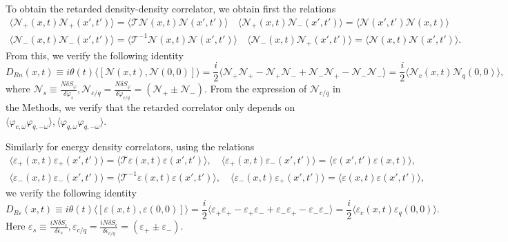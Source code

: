 \documentclass[twocolumn,floatfix,superscriptaddress]{revtex4-1}
\newcommand{\ket}{\rangle}
\newcommand{\bra}{\langle}
\begin{document}
\begin{widetext}
To obtain the retarded density-density correlator, we obtain first the relations
\begin{eqnarray}
\bra  \mathcal N_+(x,t)\mathcal N_+(x',t')\ket =\bra \mathcal T\mathcal N(x,t)\mathcal N(x',t')\ket\quad
\bra\mathcal N_+(x,t)\mathcal N_-(x',t')\ket=\bra\mathcal N(x',t')\mathcal N(x,t)\ket\nonumber\\
\bra  \mathcal N_-(x,t)\mathcal N_-(x',t')\ket =\bra \mathcal T^{-1}\mathcal N(x,t)\mathcal N(x',t')\ket\quad
\bra\mathcal N_-(x,t)\mathcal N_+(x',t')\ket=\bra\mathcal N(x,t)\mathcal N(x',t')\ket.
\end{eqnarray}
From this, we verify the following identity
\begin{equation}
D_{Rn}(x,t)\equiv i\theta(t)\bra[\mathcal N(x,t),\mathcal N(0,0)]\ket =\frac{i}{2}\bra \mathcal N_+\mathcal N_+-\mathcal N_+\mathcal N_-+\mathcal N_-\mathcal N_+-\mathcal N_-\mathcal N_-\ket=\frac{i}{2}\bra \mathcal N_c(x,t)\mathcal N_q(0,0)\ket,
\end{equation}
where $\mathcal N_s\equiv \frac{N\delta S_\varphi}{\delta \dot\varphi_s}, \mathcal N_{c/q}=\frac{N\delta S_\varphi}{\delta \dot\varphi_{c/q}}=(\mathcal N_+\pm\mathcal N_-)$. From the expression of $\mathcal N_{c/q}$ in the Methods, we verify that the retarded correlator only depends on $\bra \varphi_{c,\omega}\varphi_{q,-\omega}\ket,\bra \varphi_{q,\omega}\varphi_{q,-\omega}\ket$.  

Similarly for energy density correlators, using the relations
\begin{eqnarray}
\bra  \varepsilon_+(x,t)\varepsilon_+(x',t')\ket =\bra \mathcal T\varepsilon(x,t)\varepsilon(x',t')\ket,\quad
\bra\varepsilon_+(x,t)\varepsilon_-(x',t')\ket=\bra\varepsilon(x',t')\varepsilon(x,t)\ket,\nonumber\\
\bra  \varepsilon_-(x,t)\varepsilon_-(x',t')\ket =\bra \mathcal T^{-1}\varepsilon(x,t)\varepsilon(x',t')\ket,\quad
\bra\varepsilon_-(x,t)\varepsilon_+(x',t')\ket=\bra\varepsilon(x,t)\varepsilon(x',t')\ket,
\end{eqnarray}
we verify the following identity
\begin{equation}
D_{R\varepsilon}(x,t)\equiv i\theta(t)\bra[\varepsilon(x,t),\varepsilon(0,0)]\ket =\frac{i}{2}\bra \varepsilon_+\varepsilon_+-\varepsilon_+\varepsilon_-+\varepsilon_-\varepsilon_+-\varepsilon_-\varepsilon_-\ket=\frac{i}{2}\bra \varepsilon_c(x,t)\varepsilon_q(0,0)\ket.
\end{equation}
Here $\varepsilon_s\equiv \frac{iN\delta S_{\epsilon}}{\delta \dot\epsilon_s}, \varepsilon_{c/q}=\frac{iN\delta S_\epsilon}{\delta \dot\epsilon_{c/q}}=(\varepsilon_+\pm\varepsilon_-)$.



\end{widetext}
\end{document}

